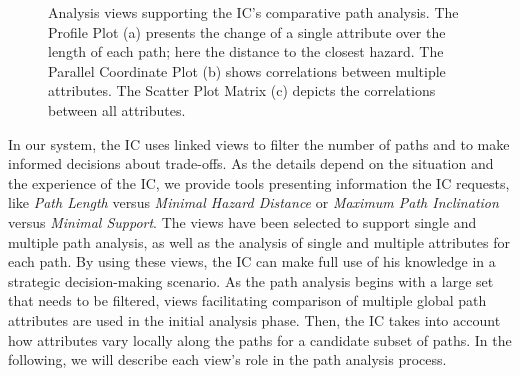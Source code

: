 \documentclass{egpubl}
\begin{document}
\begin{figure}
{	    \label{fig:overview:analysis:pcp}
	}
	\hfill
	\caption{Analysis views supporting the IC's comparative path analysis. The Profile Plot (a) presents the change of a single attribute over the length of each path; here the distance to the closest hazard. The Parallel Coordinate Plot (b) shows correlations between multiple attributes. The Scatter Plot Matrix (c) depicts the correlations between all attributes.}
\end{figure}


In our system, the IC uses linked views to filter the number of paths and to make informed decisions about trade-offs. As the details depend on the situation and the experience of the IC, we provide tools presenting information the IC requests, like \emph{Path Length} versus \emph{Minimal Hazard Distance} or \emph{Maximum Path Inclination} versus \emph{Minimal Support}. The views have been selected to support single and multiple path analysis, as well as the analysis of single and multiple attributes for each path. By using these views, the IC can make full use of his knowledge in a strategic decision-making scenario. As the path analysis begins with a large set that needs to be filtered, views facilitating comparison of multiple global path attributes are used in the initial analysis phase. Then, the IC takes into account how attributes vary locally along the paths for a candidate subset of paths. In the following, we will describe each view's role in the path analysis process.
\end{document}
